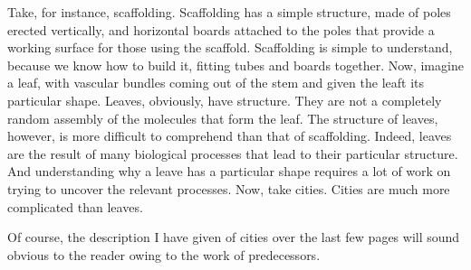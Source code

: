Take, for instance, scaffolding. Scaffolding has a simple structure, made of
poles erected vertically, and horizontal boards attached to the poles that provide a
working surface for those using the scaffold. Scaffolding is simple to
understand, because we know how to build it, fitting tubes and boards together.
Now, imagine a leaf, with vascular bundles coming out of the stem and given the
leaft its particular shape. Leaves, obviously, have structure. They are not a
completely random assembly of the molecules that form the leaf. The structure of
leaves, however, is more difficult to comprehend than that of scaffolding.
Indeed, leaves are the result of many biological processes that lead to their
particular structure. And understanding why a leave has a particular shape
requires a lot of work on trying to uncover the relevant processes. 
Now, take cities. Cities are much more complicated than leaves.

Of course, the description I have given of cities over the last few pages will
sound obvious to the reader owing to the work of predecessors.
